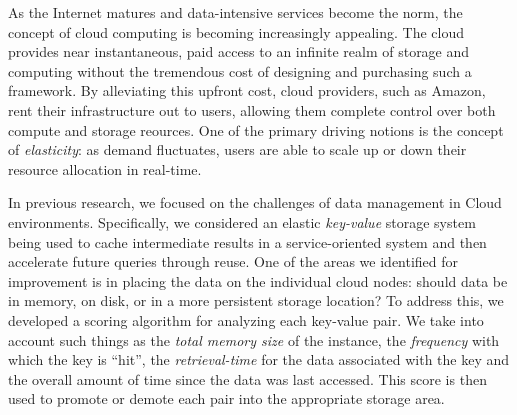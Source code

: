 As the Internet matures and data-intensive services become the norm, the
concept of cloud computing is becoming increasingly appealing. The cloud
provides near instantaneous, paid access to an infinite realm of storage and
computing without the tremendous cost of designing and purchasing such a
framework. By alleviating this upfront cost, cloud providers, such as Amazon,
rent their infrastructure out to users, allowing them complete control over
both compute and storage reources. One of the primary driving notions is the
concept of \emph{elasticity}: as demand fluctuates, users are able to scale up
or down their resource allocation in real-time.

In previous research, we focused on the challenges of data management in Cloud
environments. Specifically, we considered an elastic \emph{key-value} storage
system being used to cache intermediate results in a service-oriented system
and then accelerate future queries through reuse. One of the areas we
identified for improvement is in placing the data on the individual cloud
nodes: should data be in memory, on disk, or in a more persistent storage
location? To address this, we developed a scoring algorithm for analyzing each
key-value pair. We take into account such things as the \emph{total memory
size} of the instance, the \emph{frequency} with which the key is ``hit'', the
\emph{retrieval-time} for the data associated with the key and the overall
amount of time since the data was last accessed. This score is then used to
promote or demote each pair into the appropriate storage area.
